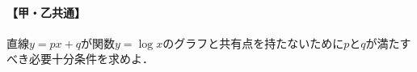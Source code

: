 \documentclass[../../main.tex]{subfiles}
\begin{document}
\paragraph{【甲・乙共通】}
直線$y=px+q$が関数$y=\log x$のグラフと共有点を持たないために$p$と$q$が満たすべき必要十分条件を求めよ．
\end{document}

